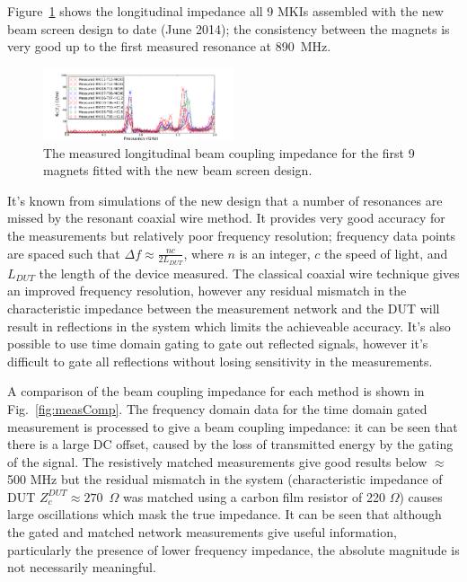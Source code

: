 \documentclass[a4paper,
              ]{jacow}
\begin{document}
Figure~\ref{fig:allNewMKIImp} shows the longitudinal impedance all 9 MKIs assembled with the new beam screen design to date (June 2014); the consistency between the magnets is very good up to the first measured resonance at 890~MHz. 

\begin{figure}
\includegraphics[width=0.5\textwidth]{TUPRI030f4.pdf}
\caption{The measured longitudinal beam coupling impedance for the first 9 magnets fitted with the new beam screen design.}
\label{fig:allNewMKIImp}
\end{figure}

It's known from simulations of the new design \cite{DayThesis} that a number of resonances are missed by the resonant coaxial wire method. It provides very good accuracy for the measurements but relatively poor frequency resolution; frequency data points are spaced such that $\Delta f \approx \frac{nc}{2L_{DUT}}$, where $n$ is an integer, $c$ the speed of light, and $L_{DUT}$ the length of the device measured. The classical coaxial wire technique gives an improved frequency resolution, however any residual mismatch in the characteristic impedance between the measurement network and the DUT will result in reflections in the system which limits the achieveable accuracy. It's also possible to use time domain gating to gate out reflected signals, however it's difficult to gate all reflections without losing sensitivity in the measurements.

A comparison of the beam coupling impedance for each method is shown in Fig.~\ref{fig:measComp}. The frequency domain data for the time domain gated measurement is processed to give a beam coupling impedance: it can be seen that there is a large DC offset, caused by the loss of transmitted energy by the gating of the signal. The resistively matched measurements give good results below $\approx$ 500 MHz but the residual mismatch in the system (characteristic impedance of DUT $Z_{c}^{DUT}\approx 270$~$\Omega$ was matched using a carbon film resistor of 220 $\Omega$) causes large oscillations which mask the true impedance. It can be seen that although the gated and matched network measurements give useful information, particularly the presence of lower frequency impedance, the absolute magnitude is not necessarily meaningful.
\end{document}
